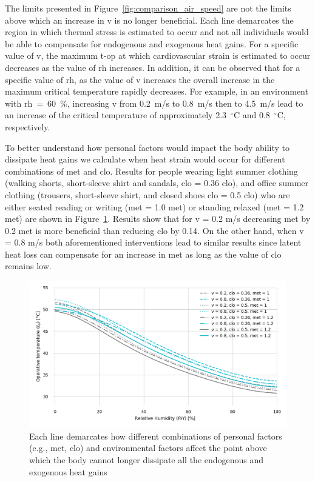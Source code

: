 The limits presented in Figure~\ref{fig:comparison_air_speed} are not the limits above which an increase in \ac{v} is no longer beneficial.
Each line demarcates the region in which thermal stress is estimated to occur and not all individuals would be able to compensate for endogenous and exogenous heat gains.
For a specific value of \ac{v}, the maximum \ac{t-op} at which cardiovascular strain is estimated to occur decreases as the value of \ac{rh} increases.
In addition, it can be observed that for a specific value of \ac{rh}, as the value of \ac{v} increases the overall increase in the maximum critical temperature rapidly decreases.
For example, in an environment with \ac{rh}~=~60~\%, increasing \ac{v} from 0.2~m/s to 0.8~m/s then to 4.5~m/s lead to an increase of the critical temperature of approximately 2.3~$^{\circ}$C and 0.8~$^{\circ}$C, respectively.

To better understand how personal factors would impact the body ability to dissipate heat gains we calculate when heat strain would occur for different combinations of \ac{met} and \ac{clo}.
Results for people wearing light summer clothing (walking shorts, short-sleeve shirt and sandals, \acs{clo} = 0.36 clo), and office summer clothing (trousers, short-sleeve shirt, and closed shoes \acs{clo} = 0.5 clo) who are either seated reading or writing (\ac{met} = 1.0 met) or standing relaxed (\ac{met} = 1.2 met) are shown in Figure~\ref{fig:met_clo}.
Results show that for \ac{v} = 0.2 m/s decreasing \ac{met} by 0.2 met is more beneficial than reducing \ac{clo} by 0.14.
On the other hand, when \ac{v} = 0.8 m/s both aforementioned interventions lead to similar results since latent heat loss can compensate for an increase in \ac{met} as long as the value of \ac{clo} remains low.

\begin{figure}[thb!]
    \centering
    \includegraphics[width=\textwidth]{figures/met_clo.png}
    \caption{Each line demarcates how different combinations of personal factors (e.g., \ac{met}, \ac{clo}) and environmental factors affect the point above which the body cannot longer dissipate all the endogenous and exogenous heat gains}
    \label{fig:met_clo}
\end{figure}

